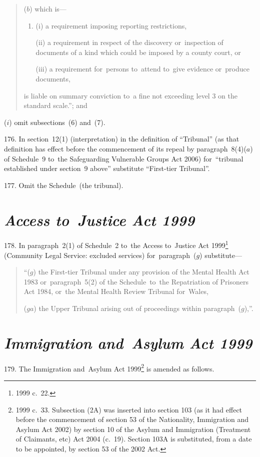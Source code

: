\documentclass[12pt,a4paper]{article}
\begin{document}
\begin{enumerate}
\begin{quotation}
\begin{enumerate}
($b$) which is—
\begin{enumerate}\item[]
(i) a requirement imposing reporting restrictions,

(ii) a requirement in respect of the discovery or~inspection of documents of a kind which could be imposed by a county court, or

(iii) a requirement for~persons to~attend to~give evidence or~produce documents,
\end{enumerate}
\end{enumerate}
is liable on summary conviction to~a fine not exceeding level 3 on the standard scale.”; and
\end{quotation}

($i$) omit subsections~(6) and~(7).
\end{enumerate}

\medskip

176.  In section~12(1) (interpretation) in the definition of “Tribunal” (as that definition has effect before the commencement of its repeal by paragraph~8(4)($a$)  of Schedule~9 to~the Safeguarding Vulnerable Groups Act 2006) for~“tribunal established under section~9 above” substitute “First-tier Tribunal”.

\medskip

177.  Omit the Schedule~(the tribunal).

\section*{\itshape Access to~Justice Act 1999}

178.  In paragraph~2(1) of Schedule~2 to~the Access to~Justice Act 1999\footnote{1999 c.~22.} (Community Legal Service: excluded services) for~paragraph~($g$)  substitute—
\begin{quotation}
“($g$) the First-tier Tribunal under any provision of the Mental Health Act 1983 or~paragraph~5(2) of the Schedule~to~the Repatriation of Prisoners Act 1984, or~the Mental Health Review Tribunal for~Wales,

($ga$) the Upper Tribunal arising out of proceedings within paragraph~($g$),”.
\end{quotation}

\section*{\itshape Immigration and~Asylum Act 1999}

179.  The Immigration and~Asylum Act 1999\footnote{1999 c.~33. Subsection (2A) was inserted into section 103 (as it had effect before the commencement of section 53 of the Nationality, Immigration and Asylum Act 2002) by section 10 of the Asylum and Immigration (Treatment of Claimants, etc) Act 2004 (c.~19). Section 103A is substituted, from a date to be appointed, by section 53 of the 2002 Act.} is amended as follows.
\end{document}
